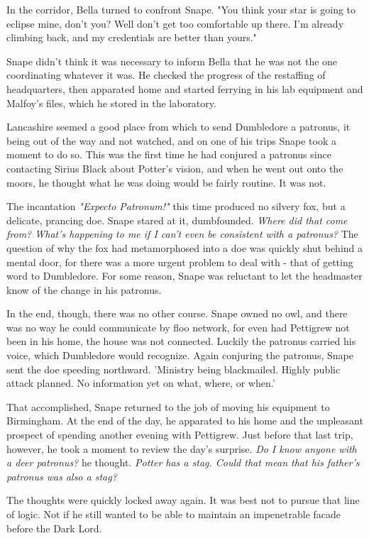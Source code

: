 \documentclass[a4paper,11pt]{article}
\begin{document}
In the corridor, Bella turned to confront Snape. "You think your star is going to eclipse mine, don't you? Well don't get too comfortable up there. I'm already climbing back, and my credentials are better than yours."

Snape didn't think it was necessary to inform Bella that he was not the one coordinating whatever it was. He checked the progress of the restaffing of headquarters, then apparated home and started ferrying in his lab equipment and Malfoy's files, which he stored in the laboratory.

Lancashire seemed a good place from which to send Dumbledore a patronus, it being out of the way and not watched, and on one of his trips Snape took a moment to do so. This was the first time he had conjured a patronus since contacting Sirius Black about Potter's vision, and when he went out onto the moors, he thought what he was doing would be fairly routine. It was not.

The incantation \emph{"Expecto Patronum!"} this time produced no silvery fox, but a delicate, prancing doe. Snape stared at it, dumbfounded. \emph{Where did that come from? What's happening to me if I can't even be consistent with a patronus?} The question of why the fox had metamorphosed into a doe was quickly shut behind a mental door, for there was a more urgent problem to deal with - that of getting word to Dumbledore. For some reason, Snape was reluctant to let the headmaster know of the change in his patronus.

In the end, though, there was no other course. Snape owned no owl, and there was no way he could communicate by floo network, for even had Pettigrew not been in his home, the house was not connected. Luckily the patronus carried his voice, which Dumbledore would recognize. Again conjuring the patronus, Snape sent the doe speeding northward. 'Ministry being blackmailed. Highly public attack planned. No information yet on what, where, or when.'

That accomplished, Snape returned to the job of moving his equipment to Birmingham. At the end of the day, he apparated to his home and the unpleasant prospect of spending another evening with Pettigrew. Just before that last trip, however, he took a moment to review the day's surprise. \emph{Do I know anyone with a deer patronus?} he thought. \emph{Potter has a stag. Could that mean that his father's patronus was also a stag?}

The thoughts were quickly locked away again. It was best not to pursue that line of logic. Not if he still wanted to be able to maintain an impenetrable facade before the Dark Lord.
\end{document}

